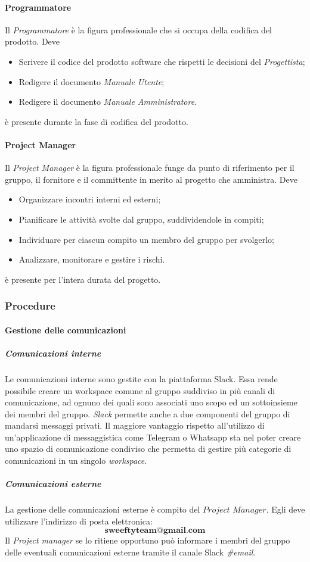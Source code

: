 		\paragraph{Programmatore} \Spazio
		Il \emph{Programmatore} è la figura professionale che si occupa della codifica del prodotto. Deve
		\begin{itemize}
			\item Scrivere il codice  del prodotto software che rispetti le decisioni del \emph{Progettista};
			\item Redigere il documento \emph{Manuale Utente};
			\item Redigere il documento \emph{Manuale Amministratore}.
		\end{itemize}
		è presente durante la fase di codifica del prodotto.
		\paragraph{Project Manager} \Spazio
		Il \emph{Project Manager} è la figura professionale funge da punto di riferimento per il gruppo, il fornitore e il committente in merito al progetto che amministra. Deve
		\begin{itemize}
			\item Organizzare incontri interni ed esterni;
			\item Pianificare le attività svolte dal gruppo, suddividendole in compiti;
			\item Individuare per ciascun compito un membro del gruppo per svolgerlo;
			\item Analizzare, monitorare e gestire i rischi.
		\end{itemize}
		è presente per l'intera durata del progetto.
	\subsubsection{Procedure}
		\paragraph{Gestione delle comunicazioni}
			\subparagraph{Comunicazioni interne} \Spazio
			\label{comInterne}
			Le comunicazioni interne sono gestite con la piattaforma Slack. Essa rende possibile creare un workspace comune al gruppo suddiviso in più canali di comunicazione, ad ognuno dei quali sono associati uno scopo ed un sottoinsieme dei membri del gruppo. \emph{Slack} permette anche a due componenti del gruppo di mandarsi messaggi privati. Il maggiore vantaggio rispetto all'utilizzo di un'applicazione di messaggistica come Telegram o Whatsapp sta nel poter creare uno spazio di comunicazione condiviso che permetta di gestire più categorie di comunicazioni in un singolo \emph{workspace}. %
			\subparagraph{Comunicazioni esterne} \Spazio
			 La gestione delle comunicazioni esterne è compito del $Project$ $Manager$. Egli deve utilizzare l'indirizzo di posta elettronica:
			$$\textbf{sweeftyteam@gmail.com}$$
			Il \emph{Project manager} se lo ritiene opportuno può informare i membri del gruppo delle eventuali comunicazioni esterne tramite il canale Slack \emph{\#email}.
			
